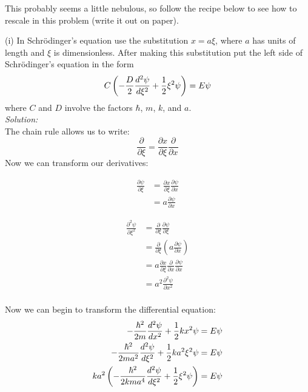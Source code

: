 \begin{enumerate}
\probtwo \label{P:12.3} This probably seems a little nebulous, so
    follow the recipe below to see how to rescale in this problem
    (write it out on paper).


    (i) In Schr\"{o}dinger's equation use the substitution $x=a
    \xi$, where $a$ has units of length and $\xi$ is
    dimensionless. After making this substitution put the left
    side of Schr\"{o}dinger's equation in the form
    \begin{equation}
        C \left(  -{D \over 2}{d^2 \psi \over d \xi^2}
        +{1 \over 2} \xi^2 \psi \right)
        = E \psi
    \end{equation}
    where $C$ and $D$ involve the factors $\hbar$, $m$, $k$, and $a$.\\
\ifsolutions
\textit{Solution:}\\
The chain rule allows us to write:
\begin{equation}
\frac{\partial}{\partial \xi} = \frac{\partial x}{\partial \xi}
\frac{\partial }{\partial x}
\end{equation}
Now we can transform our derivatives:

\begin{align}
\frac{\partial \psi}{\partial \xi} &= \frac{\partial x}{\partial \xi}
\frac{\partial \psi}{\partial x}\\
&= a \frac{\partial \psi}{\partial x}
\end{align}

\begin{align}
\frac{\partial^2 \psi}{\partial \xi^2} &= \frac{\partial }{\partial
  \xi} \frac{\partial \psi }{\partial \xi}\\
&=\frac{\partial }{\partial
  \xi} \left( a \frac{\partial \psi}{\partial x}\right)\\
&= a\frac{\partial x}{\partial \xi}
\frac{\partial }{\partial x}\frac{\partial \psi}{\partial x}\\
&= a^2\frac{\partial^2 \psi}{\partial x^2}\\
\end{align}

Now we can begin to transform the differential equation:
\begin{align}
    - {\hbar^2 \over 2 m} {d^2 \psi \over dx^2} + {1 \over 2}  k x^2 \psi &=
    E \psi\\
    - {\hbar^2 \over 2 m a^2} {d^2 \psi \over d\xi^2} + {1 \over 2}  k a^2\xi^2 \psi &=
    E \psi\\
    k a^2 \left(- {\hbar^2 \over 2 k m a^4} {d^2 \psi \over d\xi^2} + {1
        \over 2}  \xi^2 \psi \right) &=
    E \psi\\
\end{align}


\end{enumerate}
